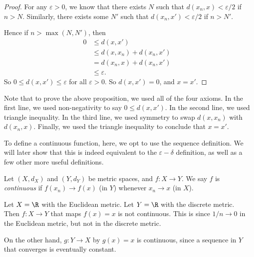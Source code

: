 \documentclass[a4paper]{article}
\begin{document}
\begin{proof}
  For any $\varepsilon > 0$, we know that there exists $N$ such that $d(x_n, x) < \varepsilon/2$ if $n > N$. Similarly, there exists some $N'$ such that $d(x_n, x') < \varepsilon/2$ if $n > N'$.
  
  Hence if $n > \max(N, N')$, then
  \begin{align*}
    0 &\leq d(x, x')\\
    &\leq d(x, x_n) + d(x_n, x')\\
    &= d(x_n, x) + d(x_n, x')\\
    &\leq \varepsilon.
  \end{align*}
  So $0 \leq d(x, x') \leq \varepsilon$ for all $\varepsilon > 0$. So $d(x, x') = 0$, and $x = x'$.
\end{proof}

Note that to prove the above proposition, we used all of the four axioms. In the first line, we used non-negativity to say $0\leq d(x, x')$. In the second line, we used triangle inequality. In the third line, we used symmetry to swap $d(x, x_n)$ with $d(x_n, x)$. Finally, we used the triangle inequality to conclude that $x = x'$.

To define a continuous function, here, we opt to use the sequence definition. We will later show that this is indeed equivalent to the $\varepsilon-\delta$ definition, as well as a few other more useful definitions.
\begin{defi}
  Let $(X, d_X)$ and $(Y, d_Y)$ be metric spaces, and $f:X \to Y$. We say $f$ is \emph{continuous} if $f(x_n) \to f(x)$ (in $Y$) whenever $x_n \to x$ (in $X$).
\end{defi}

\begin{eg}
  Let $X = \R$ with the Euclidean metric. Let $Y = \R$ with the discrete metric. Then
  $f:X \to Y$ that maps $f(x) = x$ is not continuous. This is since $1/n \to 0$ in the Euclidean metric, but not in the discrete metric.

  On the other hand, $g: Y\to X$ by $g(x) = x$ is continuous, since a sequence in $Y$ that converges is eventually constant.
\end{eg}
\end{document}
